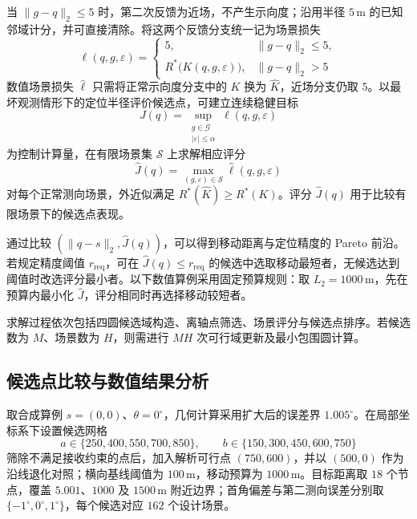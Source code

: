 \documentclass[withoutpreface,bwprint]{cumcmthesis} %
\begin{document}
当 $\|g-q\|_2\leq5$ 时，第二次反馈为近场，不产生示向度；沿用半径 $5\,\mathrm m$ 的已知邻域计分，并可直接清除。将这两个反馈分支统一记为场景损失
\begin{equation}
 \ell(q,g,\varepsilon)=
 \begin{cases}
 5,&\|g-q\|_2\leq5,\\
 R^*\bigl(K(q,g,\varepsilon)\bigr),&\|g-q\|_2>5
 \end{cases}
\end{equation}
数值场景损失 $\widehat\ell$ 只需将正常示向度分支中的 $K$ 换为 $\widehat K$，近场分支仍取 $5$。以最坏观测情形下的定位半径评价候选点，可建立连续稳健目标
\begin{equation}
 J(q)=\sup_{\substack{g\in\mathcal G\\|\varepsilon|\leq\alpha}}
 \ell(q,g,\varepsilon)
\end{equation}
为控制计算量，在有限场景集 $\mathcal S$ 上求解相应评分
\begin{equation}
 \widehat J(q)=\max_{(g,\varepsilon)\in\mathcal S}
 \widehat\ell(q,g,\varepsilon)
 \label{eq:b26-score}
\end{equation}
对每个正常测向场景，外近似满足 $R^*(\widehat K)\geq R^*(K)$。评分 $\widehat J(q)$ 用于比较有限场景下的候选点表现。

通过比较 $(\|q-s\|_2,\widehat J(q))$，可以得到移动距离与定位精度的 Pareto 前沿。若规定精度阈值 $r_{\mathrm{req}}$，可在 $\widehat J(q)\leq r_{\mathrm{req}}$ 的候选中选取移动最短者，无候选达到阈值时改选评分最小者。以下数值算例采用固定预算规则：取 $L_2=1000\,\mathrm{m}$，先在预算内最小化 $\widehat J$，评分相同时再选择移动较短者。

求解过程依次包括四圆候选域构造、离轴点筛选、场景评分与候选点排序。若候选数为 $M$、场景数为 $H$，则需进行 $MH$ 次可行域更新及最小包围圆计算。

\subsection{候选点比较与数值结果分析}
取合成算例 $s=(0,0)$、$\theta=0^\circ$，几何计算采用扩大后的误差界 $1.005^\circ$。在局部坐标系下设置候选网格
\[
 a\in\{250,400,550,700,850\},\qquad
 b\in\{150,300,450,600,750\}
\]
筛除不满足接收约束的点后，加入解析可行点 $(750,600)$，并以 $(500,0)$ 作为沿线退化对照；横向基线阈值为 $100\,\mathrm{m}$，移动预算为 $1000\,\mathrm{m}$。目标距离取 $18$ 个节点，覆盖 $5.001$、$1000$ 及 $1500\,\mathrm{m}$ 附近边界；首角偏差与第二测向误差分别取 $\{-1^\circ,0^\circ,1^\circ\}$，每个候选对应 $162$ 个设计场景。
\end{document}
